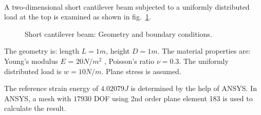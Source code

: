 \paragraph{}
A two-dimensional short cantilever beam subjected to a uniformly distributed load at the top is examined as shown
in fig.~\ref{adp_fig:ex_cantilever_beam_geo_bc}.
    \begin{figure}[h!]
    \centering
        \caption{ Short cantilever beam: Geometry and boundary conditions.}
        \label{adp_fig:ex_cantilever_beam_geo_bc}
    \end{figure}

The geometry is: length $L=1m$, height $D=1m$.
The material properties are: Young’s modulus $E$ = $20 N/m^2$ , Poisson’s ratio $ \nu =0.3$.
The uniformly distributed load is $w = 10 N/m$.
Plane stress is assumed.

The reference strain energy of $4.02079J$ is determined by the help of ANSYS.
In ANSYS, a mesh with $17930$ DOF using 2nd order plane element 183 is used to calculate the result.

